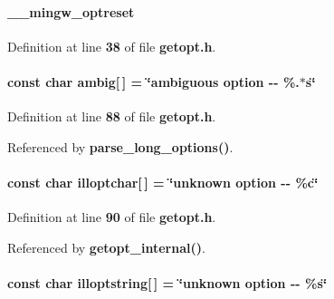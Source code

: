 \paragraph[{\+\_\+\+\_\+mingw\+\_\+optreset}]{ \+\_\+\+\_\+mingw\+\_\+optreset}\label{soapysdr_2apps_2msvc_2getopt_8h_a753074a21f65418c7c9500747ca6b9b9}


Definition at line {\bf 38} of file {\bf getopt.\+h}.

\paragraph[{ambig}]{\setlength{\rightskip}{0pt plus 5cm}const char ambig[$\,$] = \char`\"{}ambiguous {\bf option} -\/-\/ \%.$\ast$s\char`\"{}\hspace{0.3cm}{\ttfamily [static]}}\label{soapysdr_2apps_2msvc_2getopt_8h_ada1709fe1ad82fed216b6e56e46f28b3}


Definition at line {\bf 88} of file {\bf getopt.\+h}.



Referenced by {\bf parse\+\_\+long\+\_\+options()}.

\paragraph[{illoptchar}]{\setlength{\rightskip}{0pt plus 5cm}const char illoptchar[$\,$] = \char`\"{}unknown {\bf option} -\/-\/ \%{\bf c}\char`\"{}\hspace{0.3cm}{\ttfamily [static]}}\label{soapysdr_2apps_2msvc_2getopt_8h_a7f563abcc4195a52b02eb9e6b43edc3d}


Definition at line {\bf 90} of file {\bf getopt.\+h}.



Referenced by {\bf getopt\+\_\+internal()}.

\paragraph[{illoptstring}]{\setlength{\rightskip}{0pt plus 5cm}const char illoptstring[$\,$] = \char`\"{}unknown {\bf option} -\/-\/ \%s\char`\"{}\hspace{0.3cm}{\ttfamily [static]}}\label{soapysdr_2apps_2msvc_2getopt_8h_a58dd1a457abacf295251fb7d3b6e0c1d}


